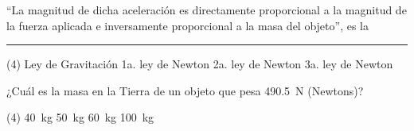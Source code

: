 \documentclass[12pt, letter]{exam}
\begin{document}
\begin{questions}
    
    \question \enquote{La magnitud de dicha aceleración es directamente proporcional a la magnitud de la fuerza aplicada e inversamente proporcional a la masa del objeto}, es la \rule{2cm}{0.1mm}
    \begin{tasks}(4)
        \task Ley de Gravitación
        \task 1a. ley de Newton
        \task 2a. ley de Newton
        \task 3a. ley de Newton
    \end{tasks}
    \question ¿Cuál es la masa en la Tierra de un objeto que pesa \SI{490.5}{\newton} (Newtons)?
    \begin{tasks}(4)
        \task \SI{40}{\kilo\gram}
        \task \SI{50}{\kilo\gram}
        \task \SI{60}{\kilo\gram}
        \task \SI{100}{\kilo\gram}
    \end{tasks}


\end{questions}
\end{document}
